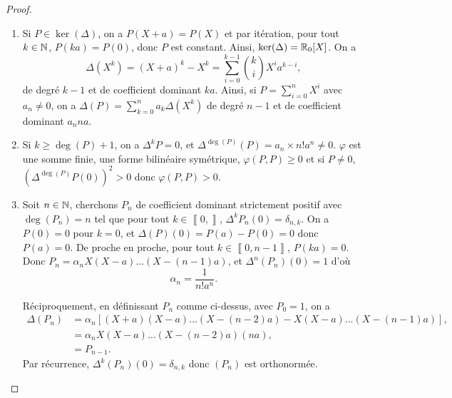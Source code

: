 \documentclass[12pt]{article}
\begin{document}
\begin{proof}
	\phantom{}
	\begin{enumerate}
		\item Si $P\in\ker(\Delta)$, on a $P(X+a)=P(X)$ et par itération, pour tout $k\in\mathbb{N}$, $P(ka)=P(0)$, donc $P$ est constant. Ainsi, $\ker(\Delta)=\mathbb{R}_{0}[X]$. On a 
		\begin{equation}
			\Delta(X^{k})=(X+a)^{k}-X^{k}=\sum_{i=0}^{k-1}\binom{k}{i}X^{i}a^{k-i},
		\end{equation}
		de degré $k-1$ et de coefficient dominant $ka$. Ainsi, si $P=\sum_{i=0}^{n}X^{i}$ avec $a_n\neq0$, on a $\Delta(P)=\sum_{k=0}^{n}a_k\Delta(X^{k})$ de degré $n-1$ et de coefficient dominant $a_n na$.

		\item Si $k\geqslant\deg(P)+1$, on a $\Delta^{k}P=0$, et $\Delta^{\deg(P)}(P)=a_n\times n!a^{n}\neq0$. $\varphi$ est une somme finie, une forme bilinéaire symétrique, $\varphi(P,P)\geqslant0$ et si $P\neq0$, $\left(\Delta^{\deg(P)}P(0)\right)^{2}>0$ donc $\varphi(P,P)>0$.
		
		\item Soit $n\in\mathbb{N}$, cherchons $P_n$ de coefficient dominant strictement positif avec $\deg(P_n)=n$ tel que pour tout $k\in\left\llbracket0,\right\rrbracket$, $\Delta^{k}P_n(0)=\delta_{n,k}$. On a $P(0)=0$ pour $k=0$, et $\Delta(P)(0)=P(a)-P(0)=0$ donc $P(a)=0$. De proche en proche, pour tout $k\in\left\llbracket0,n-1\right\rrbracket$, $P(ka)=0$. Donc $P_n=\alpha_{n}X(X-a)\dots(X-(n-1)a)$, et $\Delta^{n}(P_n)(0)=1$ d'où 
		\begin{equation}
			\alpha_n = \frac{1}{n!a^{n}}.
		\end{equation}

		Réciproquement, en définissant $P_n$ comme ci-dessus, avec $P_0=1$, on a 
		\begin{align}
			\Delta(P_n)
			&=\alpha_n\left[(X+a)(X-a)\dots(X-(n-2)a)-X(X-a)\dots(X-(n-1)a)\right],\\
			&=\alpha_n X(X-a)\dots(X-(n-2)a)(na),\\
			&=P_{n-1}.
		\end{align}
		Par récurrence, $\Delta^{k}(P_n)(0)=\delta_{n,k}$ donc $(P_n)$ est orthonormée.
	\end{enumerate}
\end{proof}
\end{document}
